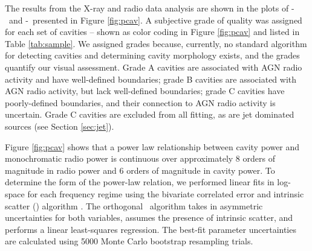 \documentclass{emulateapj}
\begin{document}
The results from the X-ray and radio data analysis are shown in the
plots of \pcav-\phigh\ and \pcav-\plow\ presented in Figure
\ref{fig:pcav}. A subjective grade of quality was assigned for each
set of cavities -- shown as color coding in Figure \ref{fig:pcav} and
listed in Table \ref{tab:sample}. We assigned grades because,
currently, no standard algorithm for detecting cavities and
determining cavity morphology exists, and the grades quantify our
visual assessment. Grade A cavities are associated with AGN radio
activity and have well-defined boundaries; grade B cavities are
associated with AGN radio activity, but lack well-defined boundaries;
grade C cavities have poorly-defined boundaries, and their connection
to AGN radio activity is uncertain. Grade C cavities are excluded from
all fitting, as are jet dominated sources (see Section \ref{sec:jet}).

Figure \ref{fig:pcav} shows that a power law relationship between
cavity power and monochromatic radio power is continuous over
approximately 8 orders of magnitude in radio power and 6 orders of
magnitude in cavity power. To determine the form of the power-law
relation, we performed linear fits in log-space for each frequency
regime using the bivariate correlated error and intrinsic scatter
(\bces) algorithm \citep{bces}. The orthogonal \bces\ algorithm takes
in asymmetric uncertainties for both variables, assumes the presence
of intrinsic scatter, and performs a linear least-squares
regression. The best-fit parameter uncertainties are calculated using
5000 Monte Carlo bootstrap resampling trials.
\end{document}
